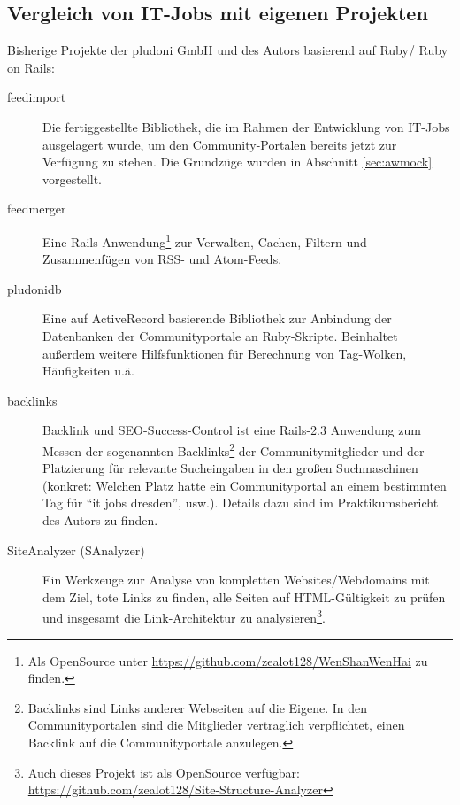 \subsection{Vergleich von IT-Jobs mit eigenen Projekten}

Bisherige Projekte der pludoni GmbH und des Autors basierend auf Ruby/ Ruby on Rails:
\begin{description}
 \item[feedimport] Die fertiggestellte Bibliothek, die im Rahmen der Entwicklung von IT-Jobs ausgelagert wurde, um den Community-Portalen bereits jetzt zur Verfügung zu stehen. Die Grundzüge wurden in Abschnitt \ref{sec:awmock} vorgestellt.
 \item[feedmerger] Eine Rails-Anwendung\footnote{ Als OpenSource unter \url{https://github.com/zealot128/WenShanWenHai} zu finden.} zur Verwalten, Cachen, Filtern und Zusammenfügen von RSS- und Atom-Feeds.
 \item[pludonidb] Eine auf ActiveRecord basierende Bibliothek zur Anbindung der Datenbanken der Communityportale an Ruby-Skripte. Beinhaltet außerdem weitere Hilfsfunktionen für Berechnung von Tag-Wolken, Häufigkeiten u.ä.
 \item[backlinks] Backlink und SEO-Success-Control ist eine Rails-2.3 Anwendung zum Messen der sogenannten Backlinks\footnote{Backlinks sind Links anderer Webseiten auf die Eigene. In den Communityportalen sind die Mitglieder vertraglich verpflichtet, einen Backlink auf die Communityportale anzulegen.} der Communitymitglieder und der Platzierung für relevante Sucheingaben in den großen Suchmaschinen (konkret: Welchen Platz hatte ein Communityportal an einem bestimmten Tag für "`it jobs dresden"', usw.). Details dazu sind im Praktikumsbericht des Autors zu finden. %

 \item[SiteAnalyzer (SAnalyzer)] Ein Werkzeuge zur Analyse von kompletten Websites/Webdomains mit dem Ziel, tote Links zu finden, alle Seiten auf HTML-Gültigkeit zu prüfen und insgesamt die Link-Architektur zu analysieren\footnote{Auch dieses Projekt ist als OpenSource verfügbar: \url{https://github.com/zealot128/Site-Structure-Analyzer}}.
\end{description}


